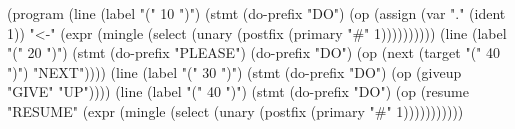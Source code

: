 \begin{CodeBlock}
(program
 (line
  (label "(" 10 ")")
  (stmt
   (do-prefix "DO")
   (op
    (assign
     (var "." (ident 1))
     "<-"
     (expr (mingle (select (unary (postfix (primary "#" 1))))))))))
 (line
  (label "(" 20 ")")
  (stmt
   (do-prefix "PLEASE")
   (do-prefix "DO")
   (op (next (target "(" 40 ")") "NEXT"))))
 (line (label "(" 30 ")") (stmt (do-prefix "DO") (op (giveup "GIVE" "UP"))))
 (line
  (label "(" 40 ")")
  (stmt
   (do-prefix "DO")
   (op
    (resume
     "RESUME"
     (expr (mingle (select (unary (postfix (primary "#" 1)))))))))))

\end{CodeBlock}
